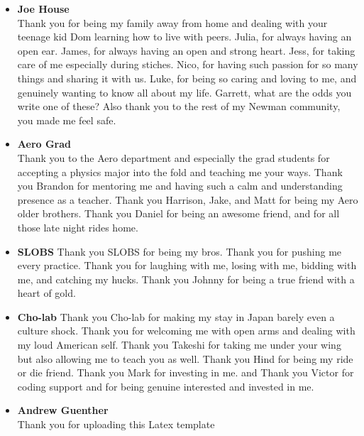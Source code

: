 \begin{itemize}
    \item \textbf{Joe House}\\
    Thank you for being my family away from home and dealing with your teenage kid Dom learning how to live with peers. Julia, for always having an open ear. James, for always having an open and strong heart. Jess, for taking care of me especially during stiches. Nico, for having such passion for so many things and sharing it with us. Luke, for being so caring and loving to me, and genuinely wanting to know all about my life. Garrett, what are the odds you write one of these? Also thank you to the rest of my Newman community, you made me feel safe.
    \item \textbf{Aero Grad}\\
    Thank you to the Aero department and especially the grad students for accepting a physics major into the fold and teaching me your ways. Thank you Brandon for mentoring me and having such a calm and understanding presence as a teacher. Thank you Harrison, Jake, and Matt for being my Aero older brothers. Thank you Daniel for being an awesome friend, and for all those late night rides home.
    \item \textbf{SLOBS}
    Thank you SLOBS for being my bros. Thank you for pushing me every practice. Thank you for laughing with me, losing with me, bidding with me, and catching my hucks. Thank you Johnny for being a true friend with a heart of gold.
    \item \textbf{Cho-lab}
    Thank you Cho-lab for making my stay in Japan barely even a culture shock. Thank you for welcoming me with open arms and dealing with my loud American self. Thank you Takeshi for taking me under your wing but also allowing me to teach you as well. Thank you Hind for being my ride or die friend. Thank you Mark for investing in me. and Thank you Victor for coding support and for being genuine interested and invested in me.
    \item \textbf{Andrew Guenther}\\
    Thank you for uploading this Latex template
\end{itemize}
